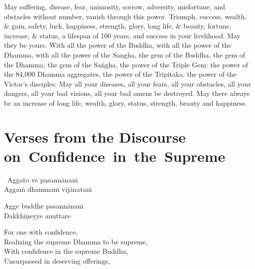 \begin{english-verses}
  May suffering, disease, fear, animosity, sorrow, adversity, misfortune, and obstacles without number, vanish through this power. Triumph, success, wealth, \& gain, safety, luck, happiness, strength, glory, long life, \& beauty, fortune, increase, \& status, a lifespan of 100 years, and success in your livelihood: May they be yours. With all the power of the Buddha, with all the power of the Dhamma, with all the power of the Sangha, the gem of the Buddha, the gem of the Dhamma, the gem of the Saṅgha, the power of the Triple Gem: the power of the 84,000 Dhamma aggregates, the power of the Tripitaka, the power of the Victor's disciples: May all your diseases, all your fears, all your obstacles, all your dangers, all your bad visions, all your bad omens be destroyed. May there always be an increase of long life, wealth, glory, status, strength, beauty and happiness.
\end{english-verses}

\suttaRef{[MJG]}

\clearpage



\section{Verses from the Discourse \mbox{on}~Confidence~in~the~Supreme}
\label{confidence-in-supreme}

\begin{pali-hang-together}
  \anglebracketleft\ \hspace{-0.5mm}Aggato ve pasannānaṁ \hspace{-0.5mm}\anglebracketright\ \\
  Aggaṁ dhammaṁ vijānataṁ
\end{pali-hang-together}
\begin{pali-hang-together}
  Agge buddhe pasannānaṁ\\
  Dakkhiṇeyye anuttare
\end{pali-hang-together}

\begin{english-verses}
  For one with confidence,\\
  Realizing the supreme Dhamma to be supreme,\\
  With confidence in the supreme Buddha,\\
  Unsurpassed in deserving offerings,
\end{english-verses}

